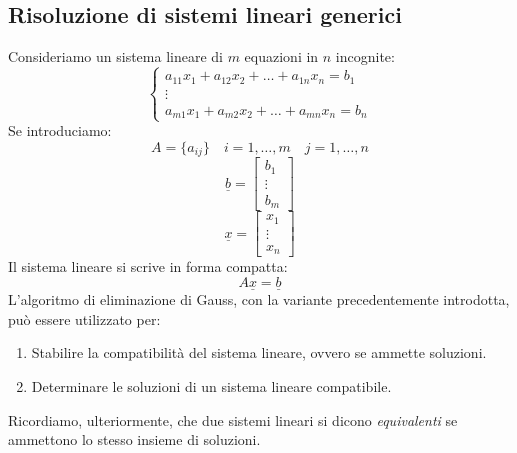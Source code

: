 \documentclass[12pt]{report}
\begin{document}
\subsection{Risoluzione di sistemi lineari generici}
Consideriamo un sistema lineare di $m$ equazioni in $n$ incognite:
\[
\begin{cases}
	a_{11}x_1 + a_{12}x_2 + \dots + a_{1n}x_n = b_1 \\
	\vdots \\
	a_{m1}x_1 + a_{m2}x_2 + \dots + a_{mn}x_n = b_n
\end{cases}
\]
Se introduciamo:
\[
A=  \{a_{ij}\} \quad i= 1, \dots, m \quad j = 1,  \dots, n
\]
\[
\underline{b} = \begin{bmatrix}
	b_1 \\
	\vdots \\
	b_m
\end{bmatrix}
\]
\[
\underline{x} = \begin{bmatrix}
	x_1 \\
	\vdots \\
	x_n
\end{bmatrix}
\]
Il sistema lineare si scrive in forma compatta:
\[
A\underline{x}=  \underline{b}
\]
L'algoritmo di eliminazione di Gauss, con la variante precedentemente introdotta, può essere utilizzato per:
\begin{enumerate}
	\item Stabilire la compatibilità del sistema lineare, ovvero se ammette soluzioni.
	\item Determinare le soluzioni di un sistema lineare compatibile.
\end{enumerate}
Ricordiamo, ulteriormente, che due sistemi lineari si dicono \textit{equivalenti} se ammettono lo stesso insieme di soluzioni.
\end{document}
